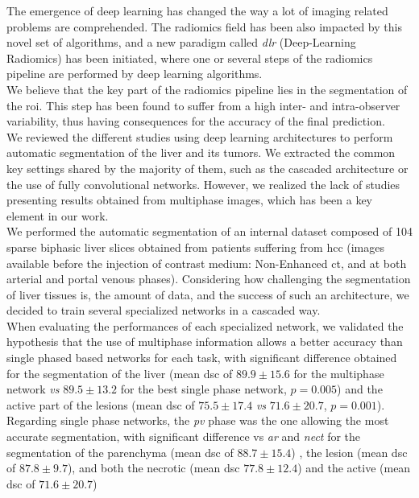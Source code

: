 The emergence of deep learning has changed the way a lot of imaging
related problems are comprehended.
The radiomics field has been also impacted by this novel set of
algorithms, and a new paradigm called \emph{\ac{dlr}} (Deep-Learning
Radiomics) has been initiated, where one or several steps of the
radiomics pipeline are performed by deep learning algorithms.\\
We believe that the key part of the radiomics pipeline lies in the
segmentation of the \ac{roi}. This step has been found to suffer from a high
inter- and intra-observer variability, thus having consequences for the
accuracy of the final prediction. \\
We reviewed the different studies using deep learning architectures to
perform automatic segmentation of the liver and its tumors. We extracted
the common key settings shared by the majority of them, such as the
cascaded architecture or the use of fully convolutional networks.
However, we realized the lack of studies presenting results obtained
from multiphase images, which has been a key element in our work. \\
We performed the automatic segmentation of an internal dataset composed
of 104 sparse biphasic liver slices obtained from patients suffering
from \ac{hcc} (images available before the injection of contrast medium:
Non-Enhanced \ac{ct}, and at both arterial and portal venous phases).
Considering how challenging the segmentation of liver tissues is, the
amount of data, and the success of such an architecture, we decided to
train several specialized networks in a cascaded way.\\
When evaluating the performances of each specialized network, we
validated the hypothesis that the use of multiphase information allows a
better accuracy than single phased based networks for each task,
with significant difference obtained for the segmentation of the liver
(mean \ac{dsc} of $ 89.9 \pm 15.6 $ for the multiphase network \emph{vs} $ 89.5 \pm
13.2 $ for the best single phase network, $p = 0.005$) and the active part of the
lesions (mean \ac{dsc} of $ 75.5 \pm 17.4 $ \emph{vs} $ 71.6 \pm 20.7 $, $p = 0.001$).\\
Regarding single phase networks, the \emph{\ac{pv}} phase was the one
allowing the most accurate segmentation, with significant difference vs
\emph{\ac{ar}} and \emph{\ac{nect}} for the segmentation of the parenchyma (mean
\ac{dsc} of $ 88.7 \pm 15.4 $) , the lesion (mean \ac{dsc} of $ 87.8 \pm 9.7 $), and both the
necrotic (mean \ac{dsc} $ 77.8 \pm 12.4 $) and the active (mean \ac{dsc} of $ 71.6 \pm 20.7 $)
